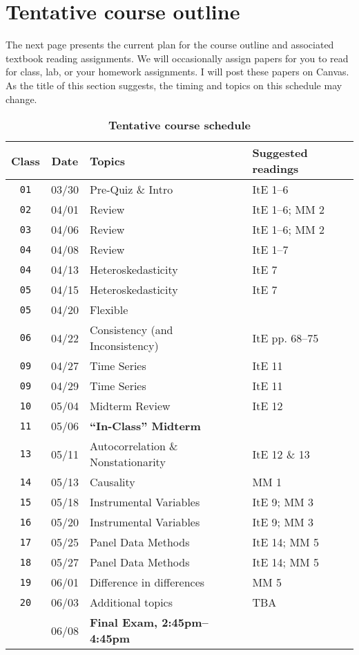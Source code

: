 \documentclass[10pt]{article}
\newcommand{\ra}[1]{\renewcommand{\arraystretch}{#1}}
\begin{document}
\section*{Tentative course outline}

The next page presents the current plan for the course outline and associated textbook reading assignments. We will occasionally assign papers for you to read for class, lab, or your homework assignments. I will post these papers on Canvas. As the title of this section suggests, the timing and topics on this schedule may change.

\begin{table}[htb]
  \caption*{\textbf{Tentative course schedule}}
  \ra{1.5}
  \begin{tabular}{@{\extracolsep{1cm}} c c l l @{}}
    \toprule
    \textbf{Class} & \textbf{Date} & \textbf{Topics} & \textbf{Suggested readings}  \\ \toprule
    \texttt{01} & 03/30 & Pre-Quiz \& Intro & ItE 1--6 \\
    \texttt{02} & 04/01 & Review & ItE 1--6; MM 2 \\
    \texttt{03} & 04/06 & Review & ItE 1--6; MM 2 \\
    \texttt{04} & 04/08 & Review & ItE 1--7 \\
    \texttt{04} & 04/13 & Heteroskedasticity & ItE 7 \\
    \texttt{05} & 04/15 & Heteroskedasticity & ItE 7 \\
    \texttt{05} & 04/20 & Flexible \\
    \texttt{06} & 04/22 & Consistency (and Inconsistency) & ItE pp. 68--75  \\
    \texttt{09} & 04/27 & Time Series & ItE 11  \\
    \texttt{09} & 04/29 & Time Series & ItE 11  \\
    \texttt{10} & 05/04 & Midterm Review & ItE 12 \\ \midrule
    \texttt{11} & 05/06 & \textbf{``In-Class'' Midterm} \\ \midrule
    \texttt{13} & 05/11 & Autocorrelation \& Nonstationarity & ItE 12 \& 13 \\
    \texttt{14} & 05/13 & Causality & MM 1 \\
    \texttt{15} & 05/18 & Instrumental Variables & ItE 9; MM 3 \\
    \texttt{16} & 05/20 & Instrumental Variables & ItE 9; MM 3 \\
    \texttt{17} & 05/25 & Panel Data Methods & ItE 14; MM 5 \\
    \texttt{18} & 05/27 & Panel Data Methods & ItE 14; MM 5 \\
    \texttt{19} & 06/01 & Difference in differences & MM 5 \\
    \texttt{20} & 06/03 & Additional topics & TBA \\ \midrule
    \texttt{  } & 06/08 & \textbf{Final Exam, 2:45pm--4:45pm} & \\
    \bottomrule
  \end{tabular}
\end{table}
\end{document}
